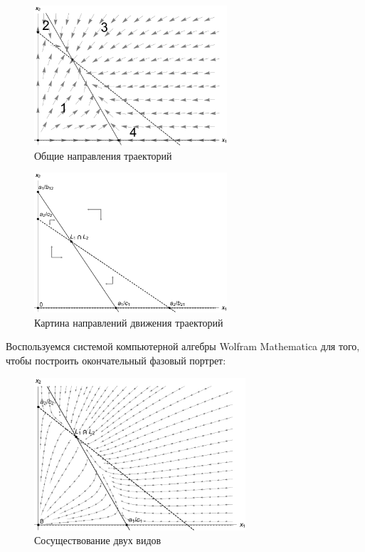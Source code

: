 \documentclass[12pt,a4paper]{article}
\begin{document}
    \pagebreak
    
    \begin{figure}[h]
        \centering
        \includegraphics[width=0.64\textwidth]{areas_1.pdf}
        \caption{Общие направления траекторий}
        \label{fig:areas_1}
    \end{figure}

    \begin{figure}[h]
        \centering
        \includegraphics[width=0.64\textwidth]{areas_1*.pdf}
        \caption{Картина направлений движения траекторий}
        \label{fig:areas_1*}
    \end{figure}

    \pagebreak

    Воспользуемся системой компьютерной алгебры Wolfram Mathematica для того, чтобы построить окончательный фазовый портрет:
    \begin{figure}[h]
        \centering
        \includegraphics[width=0.7\textwidth]{phase_1.pdf}
        \caption{Сосуществование двух видов}
        \label{fig:phase_1}
    \end{figure}
\end{document}
